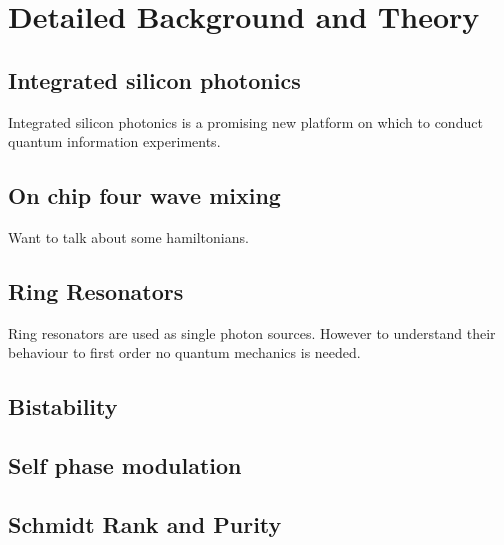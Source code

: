 \newpage
\section{Detailed Background and Theory}
\subsection{Integrated silicon photonics}
Integrated silicon photonics is a promising new platform on which to conduct quantum information experiments. 
\subsection{On chip four wave mixing}
Want to talk about some hamiltonians.
\subsection{Ring Resonators}
Ring resonators are used as single photon sources. However to understand their behaviour to first order no quantum mechanics is needed. 
\subsection{Bistability}
\subsection{Self phase modulation}
\subsection{Schmidt Rank and Purity}